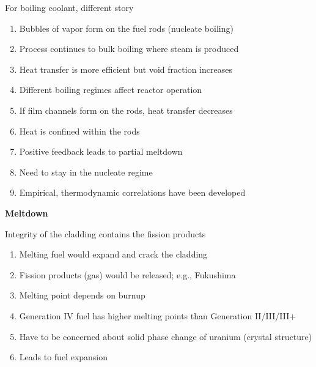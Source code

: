 \documentclass[aspectratio=1610,pdftex,dvipsnames,compress,xcolor={dvipsnames}]{beamer}
\begin{document}
\addtocounter{framenumber}{-1} 
\begin{frame}{For boiling coolant, different story}
    \begin{enumerate}[series=outerlist,topsep=0pt,itemsep=15pt,leftmargin=*,label=(\arabic*)]
        \item[]Bubbles of vapor form on the fuel rods (nucleate boiling)
        \item[]Process continues to bulk boiling where steam is produced
        \item[]Heat transfer is more efficient but void fraction increases
        \item[]Different boiling regimes affect reactor operation
        \item[]If film channels form on the rods, heat transfer decreases
        \item[]Heat is confined within the rods
        \item[]Positive feedback leads to partial meltdown
        \item[]Need to stay in the nucleate regime  
        \item[]Empirical, thermodynamic correlations have been developed
    \end{enumerate}
\end{frame}


\begin{frame}[plain]{}
    \centering\LARGE\textbf{Meltdown}
\end{frame}


\addtocounter{framenumber}{-1} 
\begin{frame}{Integrity of the cladding contains the fission products}
    \begin{enumerate}[series=outerlist,topsep=0pt,itemsep=21pt,leftmargin=*,label=(\arabic*)]
        \item[]Melting fuel would expand and crack the cladding
        \item[]Fission products (gas) would be released; e.g., Fukushima
        \item[]Melting point depends on burnup 
        \item[]Generation IV fuel has higher melting points than Generation II/III/III+
        \item[]Have to be concerned about solid phase change of uranium (crystal structure)
        \item[]Leads to fuel expansion
    \end{enumerate}
\end{frame}
\end{document}
